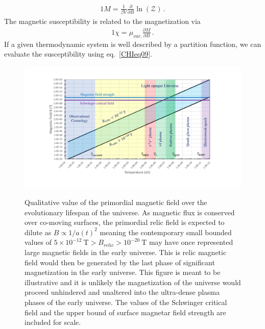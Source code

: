 \documentclass[
aps,
pra,
showpacs,
preprintnumbers,
amsmath,
amssymb,
footinbib
]{revtex4-2}
\begin{document}
\begin{alignat}{1}
  \label{Mag} M=\frac{1}{\beta V}\frac{\partial}{\partial B}\ln\left(\mathcal{Z}\right)\,.
\end{alignat}
The magnetic susceptibility is related to the magnetization via
\begin{alignat}{1}
  \label{CHIeq09} \chi=\mu_{vac.}\frac{\partial M}{\partial B}\,.
\end{alignat}
If a given thermodynamic system is well described by a partition function, we can evaluate the susceptibility using eq.~\eqref{CHIeq09}.
\begin{figure}[htbp]
  \centering
  \includegraphics[trim=110 50 120 40,clip,width=\textwidth]{./plots/relic_plot.PDF}
  \label{relic_plot}
  \caption{Qualitative value of the primordial magnetic field over the evolutionary lifespan of the universe. As magnetic flux is conserved over co-moving surfaces, the primordial relic field is expected to dilute as $B\propto1/a(t)^{2}$ meaning the contemporary small bounded values of $5\times10^{-12}\ \mathrm{T}>B_{relic}>10^{-20}\ \mathrm{T}$ may have once represented large magnetic fields in the early universe. This is relic magnetic field would then be generated by the last phase of significant magnetization in the early universe. This figure is meant to be illustrative and it is unlikely the magnetization of the universe would proceed unhindered and unaltered into the ultra-dense plasma phases of the early universe. The values of the Schwinger critical field and the upper bound of surface magnetar field strength are included for scale.}
\end{figure}

\end{document}
